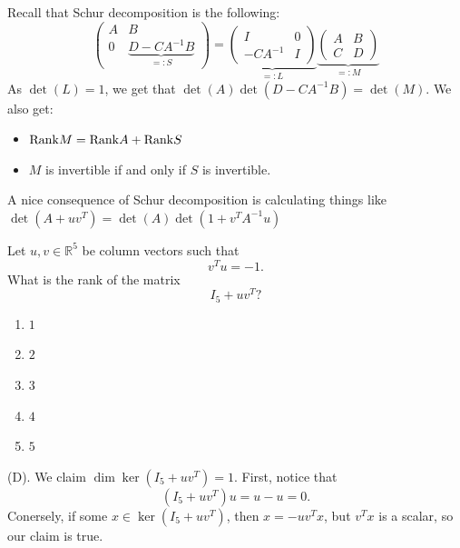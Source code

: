 \begin{remark}
Recall that Schur decomposition is the following:
\[
\begin{pmatrix}
A & B \\
0 & \underbrace{D - CA^{-1}B}_{=:S}
\end{pmatrix} = \underbrace{\begin{pmatrix}
I & 0 \\
-CA^{-1} & I
\end{pmatrix}}_{=: L } \underbrace{\begin{pmatrix}
A & B \\
C & D
\end{pmatrix}}_{=: M}
\]
As $\det(L) = 1$, we get that $\det(A) \det(D - CA^{-1}B) = \det(M)$. We also get:
\begin{itemize}
    \item $\mathrm{Rank} M = \mathrm{Rank} A + \mathrm{Rank} S$
    \item $M$ is invertible if and only if $S$ is invertible.
\end{itemize}
A nice consequence of Schur decomposition is calculating things like
$\det (A + uv^T) = \det(A) \det(1 + v^TA^{-1}u)$
\end{remark}

\begin{exercise}
Let $u,v\in\mathbb R^5$ be column vectors
such that
\[
v^Tu=-1.
\]
What is the rank of the matrix
\[
I_5+uv^T?
\]

\begin{enumerate}[label=(\Alph*)]
    \item $1$
    \item $2$
    \item $3$
    \item $4$
    \item $5$
\end{enumerate}
\end{exercise}
\begin{solution}
(D). We claim $\dim \ker(I_5 + uv^T) = 1$. First, notice that 
\[
(I_5 + uv^T)u = u - u = 0.
\]
Conersely, if some $x \in \ker(I_5 + uv^T)$, then 
$x = -uv^Tx$, but $v^Tx$ is a scalar, so our claim is true.
\end{solution}

